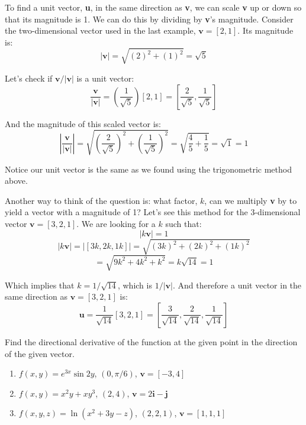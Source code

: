 To find a unit vector, \textbf{u}, in the same direction as \textbf{v}, we can scale \textbf{v} up or down so that its magnitude is 1. We can do this by dividing by \textbf{v}'s magnitude. Consider the two-dimensional vector used in the last example, $\textbf{v} = \left[ 2, 1 \right]$. Its magnitude is:
$$| \textbf{v} | = \sqrt{\left( 2 \right)^2 + \left( 1 \right)^2} = \sqrt{5}$$

Let's check if $\textbf{v} / | \textbf{v} |$ is a unit vector:
$$ \frac{\textbf{v}}{|\textbf{v}|} = \left( \frac{1}{\sqrt{5}} \right) \left[ 2, 1 \right] = \left[ \frac{2}{\sqrt{5}}, \frac{1}{\sqrt{5}} \right]$$

And the magnitude of this scaled vector is:
$$ \left| \frac{\textbf{v}}{| \textbf{v} |} \right| = \sqrt{\left( \frac{2}{\sqrt{5}} \right)^2 + \left( \frac{1}{\sqrt{5}} \right)^2} = \sqrt{\frac{4}{5} + \frac{1}{5}} = \sqrt{1} = 1$$

Notice our unit vector is the same as we found using the trigonometric method above. 

Another way to think of the question is: what factor, $k$, can we multiply \textbf{v} by to yield a vector with a magnitude of 1? Let's see this method for the 3-dimensional vector $\textbf{v} = \left[ 3, 2, 1 \right]$. We are looking for a $k$ such that:
$$|k\textbf{v}| = 1$$
$$|k \textbf{v}| = \left| \left[ 3k, 2k, 1k \right] \right| = \sqrt{\left( 3k \right)^2 + \left( 2k \right)^2 + \left( 1k \right)^2}$$
$$= \sqrt{9k^2 + 4k^2 + k^2} = k\sqrt{14} = 1$$

Which implies that $k = 1/\sqrt{14}$, which is $1/|\textbf{v}|$. And therefore a unit vector in the same direction as $\textbf{v} = \left[ 3, 2, 1 \right]$ is:
$$\textbf{u} = \frac{1}{\sqrt{14}} \left[ 3, 2, 1 \right] = \left[ \frac{3}{\sqrt{14}}, \frac{2}{\sqrt{14}}, \frac{1}{\sqrt{14}} \right]$$


\begin{Exercise}[title = {Finding Directional Derivatives}, label = direction]
Find the directional derivative of the function at the given point in the 
direction of the given vector. 
\begin{enumerate}
    \item $f(x, y) = e^{3x} \sin{2y}$, $(0, \pi/6)$, $\textbf{v} = \left[ -3, 
    4 \right]$
    \item $f(x, y) = x^2y + xy^3$, $(2, 4)$, $\textbf{v} = 2 \textbf{i} - 
    \textbf{j}$
    \item $f(x, y, z) = \ln{ \left( x^2 + 3y - z \right)}$, $(2, 2, 1)$, 
    $\textbf{v} = \left[ 1, 1, 1 \right]$
\end{enumerate}
\vspace{100mm}
\end{Exercise}

